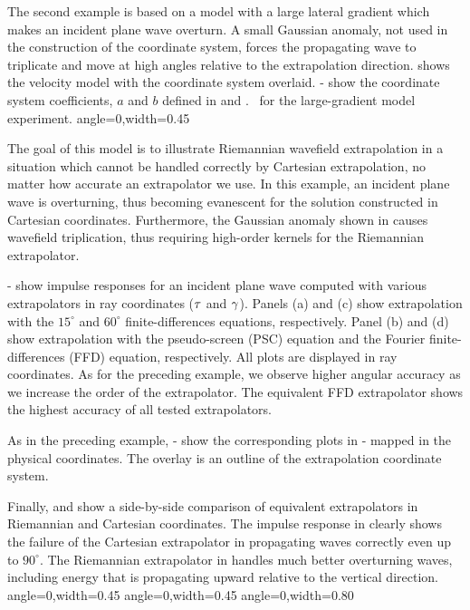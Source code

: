 The second example is based on a model with a large lateral gradient
which makes an incident plane wave overturn. A small Gaussian anomaly,
not used in the construction of the coordinate system, forces the
propagating wave to triplicate and move at high angles relative to the
extrapolation direction.  shows the velocity model with the
coordinate system overlaid. - show the
coordinate system coefficients, $a$ and $b$ defined in  and
.
{\COSlabel~for the large-gradient model experiment.}
{angle=0,width=0.45\textwidth}{\ABlabel}
\par
The goal of this model is to illustrate Riemannian wavefield
extrapolation in a situation which cannot be handled correctly by
Cartesian extrapolation, no matter how accurate an extrapolator we
use. In this example, an incident plane wave is overturning, thus
becoming evanescent for the solution constructed in Cartesian
coordinates. Furthermore, the Gaussian anomaly shown in 
causes wavefield triplication, thus requiring high-order kernels for
the Riemannian extrapolator.
\par
{}- show impulse responses for an 
incident plane wave computed with various extrapolators in ray
coordinates ($\tau$ and $\gamma$). Panels (a) and (c) show extrapolation
with the $15^\circ$ and $60^\circ$ finite-differences equations,
respectively. Panel (b) and (d) show extrapolation with the
pseudo-screen (PSC) equation and the Fourier finite-differences (FFD)
equation, respectively. All plots are displayed in ray coordinates. As
for the preceding example, we observe higher angular accuracy as we
increase the order of the extrapolator. The equivalent FFD
extrapolator shows the highest accuracy of all tested extrapolators.
\par
As in the preceding example, - show
the corresponding plots in - mapped
in the physical coordinates. The overlay is an outline of the
extrapolation coordinate system.
\par
Finally,  and  show a side-by-side
comparison of equivalent extrapolators in Riemannian and Cartesian
coordinates. The impulse response in  clearly shows
the failure of the Cartesian extrapolator in propagating waves
correctly even up to $90^\circ$. The Riemannian extrapolator in
 handles much better overturning waves, including
energy that is propagating upward relative to the vertical direction.
{angle=0,width=0.45\textwidth}{\RWElabel}
{angle=0,width=0.45\textwidth}{\CARlabel}
{angle=0,width=0.80\textwidth}{\COMPlabel}
